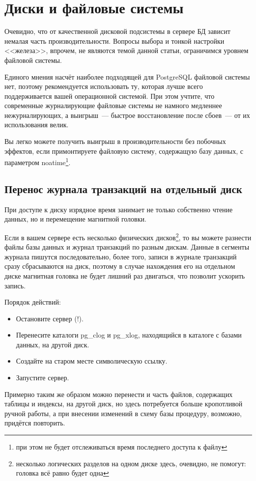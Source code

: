 \section{Диски и файловые системы}
Очевидно, что от качественной дисковой подсистемы в сервере БД зависит немалая часть производительности. Вопросы выбора и 
тонкой настройки <<железа>>, впрочем, не являются темой данной статьи, ограничимся уровнем файловой системы.

Единого мнения насчёт наиболее подходящей для PostgreSQL файловой системы нет, поэтому рекомендуется использовать ту, которая лучше 
всего поддерживается вашей операционной системой. При этом учтите, что современные журналирующие файловые системы не намного 
медленнее нежурналирующих, а выигрыш~--- быстрое восстановление после сбоев~--- от их использования велик.

Вы легко можете получить выигрыш в производительности без побочных эффектов, если примонтируете файловую систему, 
содержащую базу данных, с параметром noatime\footnote{при этом не будет отслеживаться время последнего доступа к файлу}.

\subsection{Перенос журнала транзакций на отдельный диск}
При доступе к диску изрядное время занимает не только собственно чтение данных, но и перемещение магнитной головки.

Если в вашем сервере есть несколько физических дисков\footnote{несколько логических разделов на одном диске здесь, 
очевидно, не помогут: головка всё равно будет одна}, то вы можете разнести файлы базы данных и журнал транзакций по разным 
дискам. Данные в сегменты журнала пишутся последовательно, более того, записи в журнале транзакций сразу сбрасываются на диск, 
поэтому в случае нахождения его на отдельном диске магнитная головка не будет лишний раз двигаться, что позволит ускорить запись.

Порядок действий:
\begin{itemize}
\item Остановите сервер (!).
\item Перенесите каталоги pg\_clog и pg\_xlog, находящийся в каталоге с базами данных, на другой диск. 
\item Создайте на старом месте символическую ссылку.
\item Запустите сервер.
\end{itemize}

Примерно таким же образом можно перенести и часть файлов, содержащих таблицы и индексы, на другой диск, но здесь 
потребуется больше кропотливой ручной работы, а при внесении изменений в схему базы процедуру, возможно, придётся повторить.